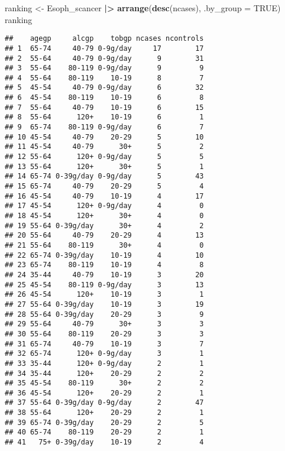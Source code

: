\documentclass[
]{article}
\newenvironment{Shaded}{\begin{snugshade}}{\end{snugshade}}
\newcommand{\AttributeTok}[1]{\textcolor[rgb]{0.13,0.29,0.53}{#1}}
\newcommand{\ConstantTok}[1]{\textcolor[rgb]{0.56,0.35,0.01}{#1}}
\newcommand{\FunctionTok}[1]{\textcolor[rgb]{0.13,0.29,0.53}{\textbf{#1}}}
\newcommand{\NormalTok}[1]{#1}
\newcommand{\OtherTok}[1]{\textcolor[rgb]{0.56,0.35,0.01}{#1}}
\newcommand{\SpecialCharTok}[1]{\textcolor[rgb]{0.81,0.36,0.00}{\textbf{#1}}}
\begin{document}
\begin{Shaded}
\begin{Highlighting}[]
\NormalTok{ranking }\OtherTok{\textless{}{-}}\NormalTok{ Esoph\_scancer }\SpecialCharTok{|\textgreater{}}
  \FunctionTok{arrange}\NormalTok{(}\FunctionTok{desc}\NormalTok{(ncases), }\AttributeTok{.by\_group =} \ConstantTok{TRUE}\NormalTok{) }
\NormalTok{ranking}
\end{Highlighting}
\end{Shaded}

\begin{verbatim}
##    agegp     alcgp    tobgp ncases ncontrols
## 1  65-74     40-79 0-9g/day     17        17
## 2  55-64     40-79 0-9g/day      9        31
## 3  55-64    80-119 0-9g/day      9         9
## 4  55-64    80-119    10-19      8         7
## 5  45-54     40-79 0-9g/day      6        32
## 6  45-54    80-119    10-19      6         8
## 7  55-64     40-79    10-19      6        15
## 8  55-64      120+    10-19      6         1
## 9  65-74    80-119 0-9g/day      6         7
## 10 45-54     40-79    20-29      5        10
## 11 45-54     40-79      30+      5         2
## 12 55-64      120+ 0-9g/day      5         5
## 13 55-64      120+      30+      5         1
## 14 65-74 0-39g/day 0-9g/day      5        43
## 15 65-74     40-79    20-29      5         4
## 16 45-54     40-79    10-19      4        17
## 17 45-54      120+ 0-9g/day      4         0
## 18 45-54      120+      30+      4         0
## 19 55-64 0-39g/day      30+      4         2
## 20 55-64     40-79    20-29      4        13
## 21 55-64    80-119      30+      4         0
## 22 65-74 0-39g/day    10-19      4        10
## 23 65-74    80-119    10-19      4         8
## 24 35-44     40-79    10-19      3        20
## 25 45-54    80-119 0-9g/day      3        13
## 26 45-54      120+    10-19      3         1
## 27 55-64 0-39g/day    10-19      3        19
## 28 55-64 0-39g/day    20-29      3         9
## 29 55-64     40-79      30+      3         3
## 30 55-64    80-119    20-29      3         3
## 31 65-74     40-79    10-19      3         7
## 32 65-74      120+ 0-9g/day      3         1
## 33 35-44      120+ 0-9g/day      2         1
## 34 35-44      120+    20-29      2         2
## 35 45-54    80-119      30+      2         2
## 36 45-54      120+    20-29      2         1
## 37 55-64 0-39g/day 0-9g/day      2        47
## 38 55-64      120+    20-29      2         1
## 39 65-74 0-39g/day    20-29      2         5
## 40 65-74    80-119    20-29      2         1
## 41   75+ 0-39g/day    10-19      2         4

\end{verbatim}
\end{document}
